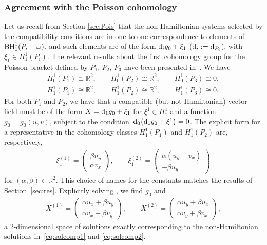 \documentclass[pdftex]{sigma}
\numberwithin{equation}{section}
\begin{document}
\subsubsection{Agreement with the Poisson cohomology}
Let us recall from Section \ref{sec:Pois} that the non-Hamiltonian systems selected by the compatibility conditions are in one-to-one correspondence to elements of ${\rm BH}^1_1(P_i+\omega)$, and such elements are of the form ${\rm d}_i g_0+\xi_1$ (${\rm d}_i:={\rm d}_{P_i}$), with $\xi_1\in H^1_1(P_i)$. The relevant results about the first cohomology group for the Poisson bracket defined by $P_1$, $P_2$, $P_3$ have been presented in~\cite{casati2015deformations}. We have
\begin{gather*}
H^1_0(P_1)\cong \mathbb{R}^2, \qquad H^1_0(P_2)\cong \mathbb{R}^2, \qquad H^1_0(P_3)\cong 0, \\
H^1_1(P_1)\cong \mathbb{R}^2, \qquad H^1_1(P_2)\cong \mathbb{R}^2 , \qquad H^1_1(P_3)\cong 0.
\end{gather*}
For both $P_1$ and $P_2$, we have that a compatible (but not Hamiltonian) vector field must be of the form
$X={\rm d}_1 g_0+\xi_1$
for $\xi^1\in H^1_1$ and a function $g_0=g_0(u,v)$, subject to the condition~${{\rm d}_0\big({\rm d}_1g_0+\xi^1\big)=0}$. The explicit form for a representative in the cohomology classes $H^1_1(P_1)$ and $H^1_1(P_2)$ are, respectively,
\begin{gather*}
\xi_1^{(1)}=\begin{pmatrix} \beta u_y\\ \alpha v_x\end{pmatrix},\qquad\xi_1^{(2)}=\begin{pmatrix} \alpha (u_y-v_x)\\-\beta u_y\end{pmatrix}
\end{gather*}
for $(\alpha,\beta)\in\mathbb{R}^2$. This choice of names for the constants matches the results of Section~\ref{sec:res}. Explicitly solving , we find $g_0$ and
\begin{gather*}%
X^{(1)}=\begin{pmatrix}\alpha u_x+\beta u_y\\\alpha v_x+\beta v_y\end{pmatrix}, \qquad X^{(2)}=\begin{pmatrix}\alpha u_y+\beta u_x\\ \alpha v_y+\beta v_x\end{pmatrix},
\end{gather*}
a 2-dimensional space of solutions exactly corresponding to the non-Hamiltonian solutions in~\eqref{eq:solcomp1} and \eqref{eq:solcomp2}.
\end{document}

